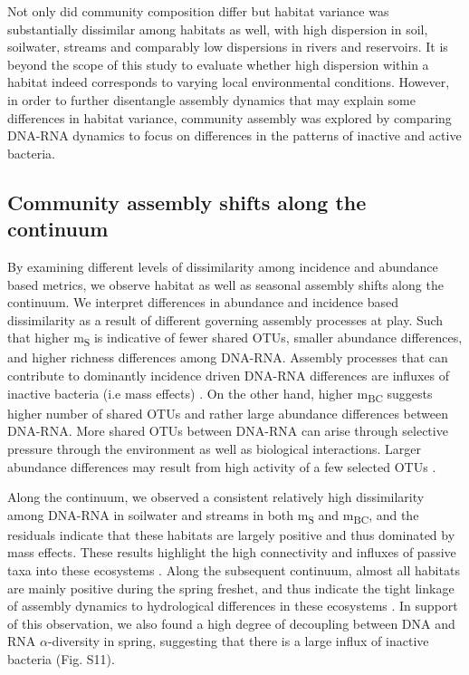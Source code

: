 \documentclass[12pt,a4paper]{article} %
\begin{document}
Not only did community composition differ but habitat variance was substantially dissimilar among habitats as well, with high dispersion in soil, soilwater, streams and comparably low dispersions in rivers and reservoirs. It is beyond the scope of this study to evaluate whether high dispersion within a habitat indeed corresponds to varying local environmental conditions. However, in order to further disentangle assembly dynamics that may explain some differences in habitat variance, community assembly was explored by comparing DNA-RNA dynamics to focus on differences in the patterns of inactive and active bacteria.

\subsection*{Community assembly shifts along the continuum}
By examining different levels of dissimilarity among incidence and abundance based metrics, we observe habitat as well as seasonal assembly shifts along the continuum. We interpret differences in abundance and incidence based dissimilarity as a result of different governing assembly processes at play. Such that higher m\textsubscript{S} is indicative of fewer shared OTUs, smaller abundance differences, and higher richness differences among DNA-RNA. Assembly processes that can contribute to dominantly incidence driven DNA-RNA differences are influxes of inactive bacteria (i.e mass effects) \citep{Leibold2004a}. On the other hand, higher m\textsubscript{BC} suggests higher number of shared OTUs and rather large abundance differences between DNA-RNA. More shared OTUs between DNA-RNA can arise through selective pressure through the environment as well as biological interactions. Larger abundance differences may result from high activity of a few selected OTUs \citep{Campbell2013}.

Along the continuum, we observed a consistent relatively high dissimilarity among DNA-RNA in soilwater and streams in both m\textsubscript{S} and m\textsubscript{BC}, and the residuals indicate that these habitats are largely positive and thus dominated by mass effects. These results highlight the high connectivity and influxes of passive taxa into these ecosystems \citep{Ruiz-Gonzalez2015, Hauptmann2016, Crump2012}. Along the subsequent continuum, almost all habitats are mainly positive during the spring freshet, and thus indicate the tight linkage of assembly dynamics to hydrological differences in these ecosystems \citep{Nino-Garcia2016, Read2015}. In support of this observation, we also found a high degree of decoupling between DNA and RNA $\alpha$-diversity in spring, suggesting that there is a large influx of inactive bacteria (Fig. S11).
\end{document}
